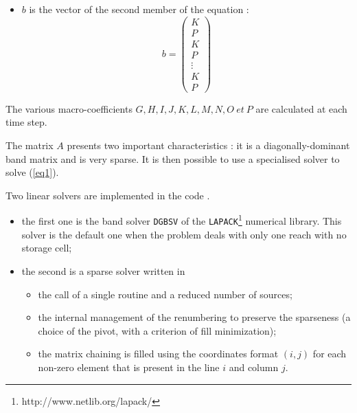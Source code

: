 \begin{itemize}
\begin{equation}
   \end{equation}
 \item $b$ is the vector of the second member of the equation :
   \begin{equation}
      \label{eq2}
      b = \left(
            \begin{array}{c}
               K\\
               P\\
               K\\
               P\\
               \vdots\\
               K\\
               P
            \end{array}
          \right)
   \end{equation}
\end{itemize}

The various macro-coefficients $G, H, I, J, K, L, M, N, O\ et\ P$ are calculated at each time step.

The matrix $A$ presents two important characteristics : it is a diagonally-dominant band matrix and is very sparse. It is then possible to use a specialised solver to solve (\ref{eq1}).

Two linear solvers are implemented in the code \REZO{}.

\begin{itemize}
  \item the first one is the band solver \texttt{DGBSV} of the \texttt{LAPACK}\footnote{http://www.netlib.org/lapack/} numerical library. This solver is the default one when the problem deals with only one reach with no storage cell;
  \item the second is a sparse solver written in %
\begin{itemize}
 \item the call of a single routine and a reduced number of sources;
 \item the internal management of the renumbering to preserve the sparseness (a choice of the pivot, with a criterion of fill minimization);
 \item the matrix chaining is filled using the coordinates format $(i,j)$ for each non-zero element that is present in the line $i$ and column $j$.
\end{itemize}

\end{itemize}

